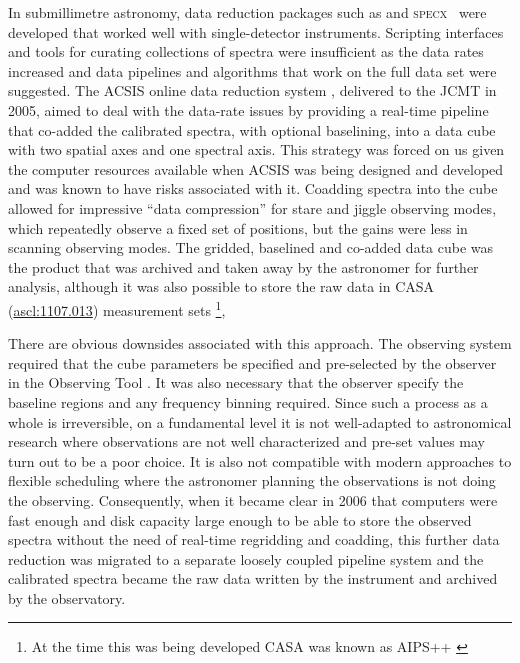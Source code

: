 \documentclass[a4paper,fleqn,usenatbib]{mnras}
\newcommand{\specx}{\textsc{specx}}
\newcommand{\ascl}[1]{\href{http://www.ascl.net/#1}{ascl:#1}}
\begin{document}
In submillimetre astronomy, data reduction packages such as
\citep[][\ascl{1305.010}]{2005sf2a.conf..721P} and
\specx\ \citep[][\ascl{1310.008}]{SPECX,1990JCMTP...9...25P} were developed that worked well with
single-detector instruments. Scripting interfaces and tools for
curating collections of spectra were insufficient as the data rates
increased and data pipelines \citep[e.g.,][]{1995ASPC...75..117W} and
algorithms that work on the full data set
\citep[e.g.,][]{2002ASPC..278..329M} were suggested. The ACSIS online data
reduction system \citep{2000ASPC..216..502L,2000SPIE.4015..114H},
delivered to the JCMT in 2005, aimed to deal with the data-rate issues
by providing a real-time pipeline that co-added the calibrated
spectra, with optional baselining, into a data cube with two spatial axes and one spectral axis.  This strategy
was forced on us given the computer resources available when ACSIS was
being designed and developed and was known to have risks associated
with it. Coadding spectra into the cube allowed for impressive ``data
compression'' for stare and jiggle observing modes, which repeatedly
observe a fixed set of positions, but the gains were less in scanning
observing modes.
The gridded, baselined and co-added data cube was the product that was archived
and taken away by the astronomer for further analysis, although it was
also possible to store the raw data in CASA (\ascl{1107.013}) measurement sets
\citep{2012ASPC..461..849P}\footnote{At the time this was being
developed CASA was known as AIPS++ \citep{2004ASPC..314..468M}},

There are obvious downsides associated with this approach. The
observing system required that the cube parameters be specified and
pre-selected by the observer in the Observing Tool
\citep{2002ASPC..281..453F}. It was also
necessary that the observer specify the baseline regions and any
frequency binning required. Since such a process as a whole is
irreversible, on a fundamental level it is not well-adapted to
astronomical research where observations are not well characterized
and pre-set values may turn out to be a poor choice. It is also not
compatible with modern approaches to flexible scheduling
\citep{2002ASPC..281..488E} where the astronomer planning the
observations is not doing the observing. Consequently,
when it became clear in 2006 that computers were fast enough and disk capacity
large enough to be able to store the observed spectra without the need
of real-time regridding and coadding, this further data reduction was
migrated to a separate loosely coupled pipeline system and the calibrated
spectra became the raw data written by the instrument and archived by
the observatory.
\end{document}
